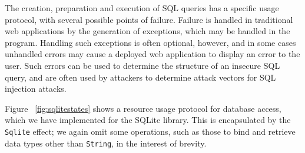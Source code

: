 \documentclass[preprint]{sigplanconf}
\begin{document}
The creation, preparation and execution of SQL queries has a specific usage protocol, with several possible points of failure. Failure is handled in traditional web applications by the generation of exceptions, which may be handled in the program.
Handling such exceptions is often optional, however, and in some cases unhandled errors may cause a deployed web application to display an error to the user. Such errors can be used to determine the structure of an insecure SQL query, and are often used by attackers to determine attack vectors for SQL injection attacks.

Figure ~\ref{fig:sqlitestates} shows a resource usage protocol for database access, which we have implemented for the SQLite library. This is encapsulated by the \texttt{Sqlite} effect; we again omit some operations, such as those to bind and retrieve data types other than \texttt{String}, in the interest of brevity.
\end{document}
